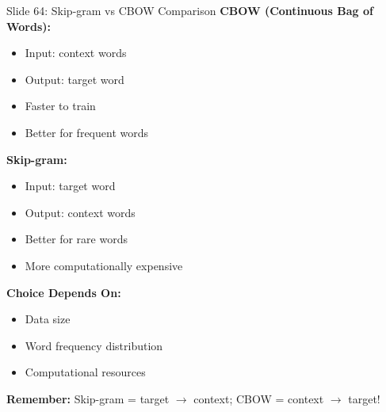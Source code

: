 \documentclass[8pt]{beamer}
\begin{document}
	\begin{frame}{Slide 64: Skip-gram vs CBOW Comparison}
		\fontsize{6.5}{7.5}\selectfont
		\textbf{CBOW (Continuous Bag of Words):}
		\begin{itemize}
			\item Input: context words
			\item Output: target word
			\item Faster to train
			\item Better for frequent words
		\end{itemize}
		
		\vspace{0.1cm}
		\textbf{Skip-gram:}
		\begin{itemize}
			\item Input: target word
			\item Output: context words
			\item Better for rare words
			\item More computationally expensive
		\end{itemize}
		
		\vspace{0.1cm}
		\textbf{Choice Depends On:}
		\begin{itemize}
			\item Data size
			\item Word frequency distribution
			\item Computational resources
		\end{itemize}
		
		\textcolor{myblue}{\textbf{Remember:}} Skip-gram = target $\to$ context; CBOW = context $\to$ target!
	\end{frame}
	
\end{document}
